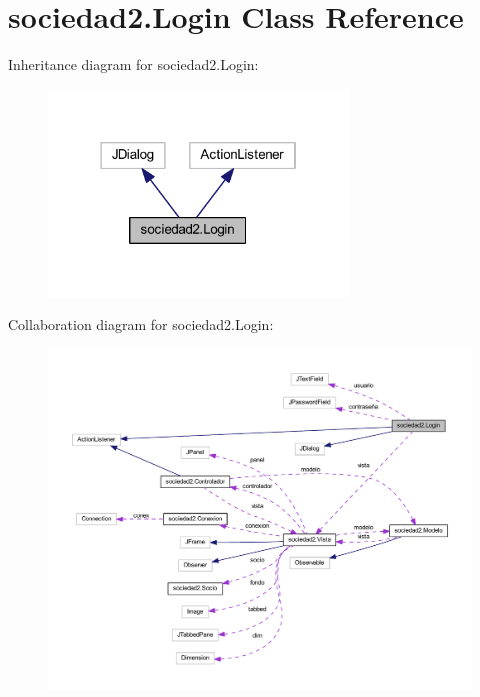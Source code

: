 \hypertarget{classsociedad2_1_1_login}{}\section{sociedad2.\+Login Class Reference}
\label{classsociedad2_1_1_login}


Inheritance diagram for sociedad2.\+Login\+:
\nopagebreak
\begin{figure}[H]
\begin{center}
\leavevmode
\includegraphics[width=226pt]{classsociedad2_1_1_login__inherit__graph}
\end{center}
\end{figure}


Collaboration diagram for sociedad2.\+Login\+:
\nopagebreak
\begin{figure}[H]
\begin{center}
\leavevmode
\includegraphics[width=350pt]{classsociedad2_1_1_login__coll__graph}
\end{center}
\end{figure}
